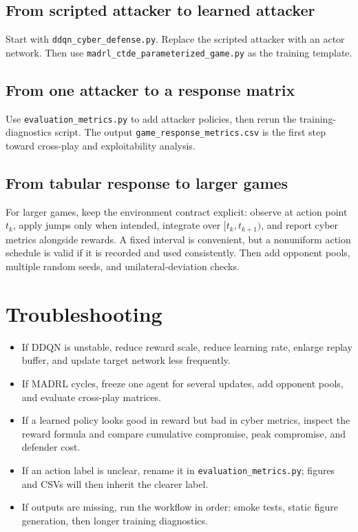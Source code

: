 \documentclass[11pt,a4paper]{article}
\begin{document}
\subsection{From scripted attacker to learned attacker}
Start with \texttt{ddqn\_cyber\_defense.py}. Replace the scripted attacker with an actor network. Then use \texttt{madrl\_ctde\_parameterized\_game.py} as the training template.

\subsection{From one attacker to a response matrix}
Use \texttt{evaluation\_metrics.py} to add attacker policies, then rerun the training-diagnostics script.  The output \texttt{game\_response\_metrics.csv} is the first step toward cross-play and exploitability analysis.

\subsection{From tabular response to larger games}
For larger games, keep the environment contract explicit: observe at action point $t_k$, apply jumps only when intended, integrate over $[t_k,t_{k+1})$, and report cyber metrics alongside rewards. A fixed interval is convenient, but a nonuniform action schedule is valid if it is recorded and used consistently. Then add opponent pools, multiple random seeds, and unilateral-deviation checks.

\section{Troubleshooting}
\begin{itemize}
\item If DDQN is unstable, reduce reward scale, reduce learning rate, enlarge replay buffer, and update target network less frequently.
\item If MADRL cycles, freeze one agent for several updates, add opponent pools, and evaluate cross-play matrices.
\item If a learned policy looks good in reward but bad in cyber metrics, inspect the reward formula and compare cumulative compromise, peak compromise, and defender cost.
\item If an action label is unclear, rename it in \texttt{evaluation\_metrics.py}; figures and CSVs will then inherit the clearer label.
\item If outputs are missing, run the workflow in order: smoke tests, static figure generation, then longer training diagnostics.
\end{itemize}
\end{document}
